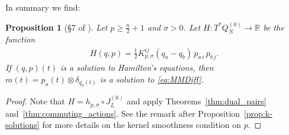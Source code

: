 \documentclass[12pt]{amsart}
\newcommand{\R}{\ensuremath{\mathbb{R}}}
\newtheorem{prop}[thm]{Proposition}
\begin{document}
  In summary we find:
  \begin{prop}[\S7 of \cite{MumfordMichor2013}] \label{prop:0-solutions}
  Let $p \geq \frac{n}{2} +1$ and $\sigma > 0$.
  Let $H:T^*Q_N^{(0)} \to \R$ be the function
  \begin{align*}
    H(q,p) =\frac{1}{2} K_{p,\sigma}^{ij}(q_a - q_b)\, p_{a\,i}\, p_{b\,j}.
  \end{align*}
  If $(q,p)(t)$ is a solution to Hamilton's equations, then
  $m(t) = p_a(t) \otimes \delta_{q_a(t)}$
  is a solution to \eqref{eq:MMDiff}.
\end{prop}
\begin{proof}
	Note that $H = h_{p,\sigma} \circ J_L^{(0)}$ and apply Theorems~\ref{thm:dual_pairs} and~\ref{thm:commuting_actions}.
  See the remark after Proposition~\ref{prop:k-solutions} for more details on the kernel smoothness condition on $p$.
\end{proof}
\end{document}
